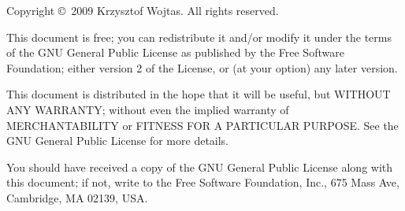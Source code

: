 \begingroup

	\newlength{\centeroffset}
	\setlength{\centeroffset}{-0.5\oddsidemargin}
	\addtolength{\centeroffset}{0.5\evensidemargin}

	\begingroup
		\sffamily
		\thispagestyle{empty}

		\noindent\hspace*{\centeroffset}


		\noindent\hspace*{\centeroffset}

		\pagebreak
	\endgroup

	\begingroup
		\setlength{\parindent}{0pt}
		\setlength{\parskip}{1ex}

		\begingroup
			\TPSwitchToEnglish
			\begin{small}
				Copyright \copyright\ 2009 Krzysztof Wojtas. All rights reserved.
				
				This document is free; you can redistribute it and/or modify it under the terms of the GNU General Public License as published by the Free Software Foundation; either version 2 of the License, or (at your option) any later version.

				This document is distributed in the hope that it will be useful, but WITHOUT ANY WARRANTY; without even the implied warranty of MERCHANTABILITY or FITNESS FOR A PARTICULAR PURPOSE\@.  See the GNU General Public License for more details.

				You should have received a copy of the GNU General Public License along with this document; if not, write to the Free Software Foundation, Inc., 675 Mass Ave, Cambridge, MA 02139, USA.
			\end{small}
		\endgroup
		
